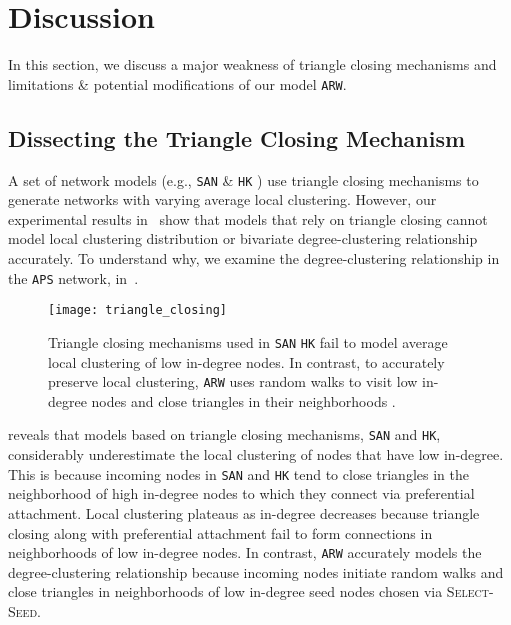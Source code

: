 
\section{Discussion}
\label{sec:Discussion}
In this section, we discuss a major weakness of triangle closing mechanisms
and limitations \& potential modifications of our model \texttt{ARW}.

\subsection{Dissecting the Triangle Closing Mechanism}
\label{ss:tc}

A set of network models (e.g., \texttt{SAN} \cite{gong2012evolution} \& \texttt{HK} \cite{holme2002growing})
use triangle closing mechanisms to generate networks with
varying average local clustering. However, our experimental results
in~ show that models that rely on triangle closing
cannot model local clustering distribution or bivariate degree-clustering
relationship accurately. To understand why, we examine the degree-clustering
relationship in the \texttt{APS} network, in~.
\begin{figure}[h]
    \centering
    \texttt{[image: triangle\_closing]}
    \caption{Triangle closing mechanisms used in \texttt{SAN} \texttt{HK} fail to
    model average local clustering of low in-degree nodes. In contrast,
    to accurately preserve local clustering, \texttt{ARW} uses {random walks} to visit
    low in-degree nodes and close triangles in their neighborhoods .}
    \label{fig:triangle_closing}
\end{figure}

 reveals that models based on triangle closing mechanisms,
\texttt{SAN} and \texttt{HK}, considerably underestimate the local clustering of
nodes that have low in-degree. This is because incoming nodes in \texttt{SAN} and \texttt{HK}
tend to close triangles in the neighborhood of high in-degree nodes to which they
connect via preferential attachment. Local clustering plateaus as in-degree decreases because
triangle closing along with preferential attachment fail to form connections in neighborhoods
of low in-degree nodes. In contrast, \texttt{ARW} accurately models the degree-clustering relationship
because incoming nodes initiate random walks and close triangles in neighborhoods of low in-degree
seed nodes chosen via \textsc{Select-Seed}.

